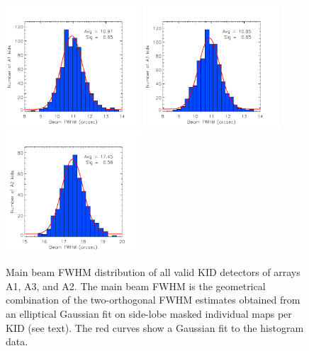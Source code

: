\begin{figure}[ht!]
  \centering
  \includegraphics[clip=true,width=0.45\textwidth]{Figures/Papier2017/plot_histo_A1_fwhm_20170424s123.pdf}
  \includegraphics[clip=true,width=0.45\textwidth]{Figures/Papier2017/plot_histo_A3_fwhm_20170424s123.pdf}
  \includegraphics[clip=true,width=0.45\textwidth]{Figures/Papier2017/plot_histo_A2_fwhm_20170424s123.pdf}
  
\caption[Main beam FWHM distribution across the array]{Main beam FWHM distribution of all valid KID detectors of arrays A1, A3, and A2. The main beam FWHM is the geometrical combination of the two-orthogonal FWHM estimates obtained from an elliptical Gaussian fit on side-lobe masked individual maps per KID (see text). The red curves show a Gaussian fit to the histogram data.}
  \label{fig:focalplane_histo}
\end{figure}


